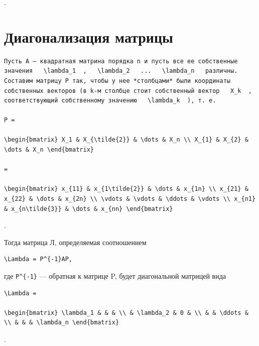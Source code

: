 \documentclass[
  ukrainian,
]{article}
\begin{document}
.

\section{Диагонализация
матрицы}\label{ux434ux438ux430ux433ux43eux43dux430ux43bux438ux437ux430ux446ux438ux44f-ux43cux430ux442ux440ux438ux446ux44b}

\begin{verbatim}
Пусть A — квадратная матрина порядка n и пусть все ее собственные значения   \lambda_1  ,   \lambda_2   ...   \lambda_n   различны. Составим матрицу P так, чтобы у нее *столбцами* были координаты собственных векторов (в k-м столбце стоит собственный вектор   X_k  , соответствующий собственному значению   \lambda_k  ), т. е.

P =

\begin{bmatrix} X_1 & X_{\tilde{2}} & \dots & X_n \\ X_{1} & X_{2} & \dots & X_n \end{bmatrix}

=

\begin{bmatrix} x_{11} & x_{1\tilde{2}} & \dots & x_{1n} \\ x_{21} & x_{22} & \dots & x_{2n} \\ \vdots & \vdots & \ddots & \vdots \\ x_{n1} & x_{n\tilde{3}} & \dots & x_{nn} \end{bmatrix}
\end{verbatim}

.

Тогда матрица Л, определяемая соотношением

\begin{verbatim}
\Lambda = P^{-1}AP,
\end{verbatim}

где \texttt{P\^{}\{-1\}} --- обратная к матрице P, будет диагональной
матрицей вида

\begin{verbatim}
\Lambda =

\begin{bmatrix} \lambda_1 & & & \\ & \lambda_2 & 0 & \\ & & \ddots & \\ & & & \lambda_n \end{bmatrix}
\end{verbatim}

.
\end{document}
